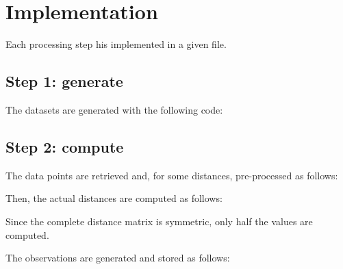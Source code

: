 \documentclass[10pt,a4paper,fleqn]{article}
\begin{document}
  
\section{Implementation}

Each processing step his implemented in a given file.

\subsection{Step 1: generate}

The datasets are generated with the following code:


\subsection{Step 2: compute} 


The data points are retrieved and, for some distances, pre-processed as follows:
 

Then, the actual distances are computed as follows:
 
Since the complete distance matrix is symmetric, only half the values are computed.

The observations are generated and stored as follows:
   
  
  
% 
% 
  
\end{document}
